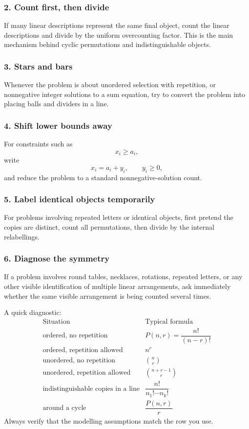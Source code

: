 \subsubsection*{2. Count first, then divide}
If many linear descriptions represent the same final object, count the linear descriptions and divide by the uniform overcounting factor. This is the main mechanism behind cyclic permutations and indistinguishable objects.

\subsubsection*{3. Stars and bars}
Whenever the problem is about unordered selection with repetition, or nonnegative integer solutions to a sum equation, try to convert the problem into placing balls and dividers in a line.

\subsubsection*{4. Shift lower bounds away}
For constraints such as
\[
x_i\ge a_i,
\]
write
\[
x_i=a_i+y_i,\qquad y_i\ge 0,
\]
and reduce the problem to a standard nonnegative-solution count.

\subsubsection*{5. Label identical objects temporarily}
For problems involving repeated letters or identical objects, first pretend the copies are distinct, count all permutations, then divide by the internal relabellings.

\subsubsection*{6. Diagnose the symmetry}
If a problem involves round tables, necklaces, rotations, repeated letters, or any other visible identification of multiple linear arrangements, ask immediately whether the same visible arrangement is being counted several times.

\begin{examtip}[title={High-yield distinction table}]
A quick diagnostic:
\[
\begin{array}{c|c}
\text{Situation} & \text{Typical formula} \\ \hline
\text{ordered, no repetition} & P(n,r)=\dfrac{n!}{(n-r)!} \\
\text{ordered, repetition allowed} & n^r \\
\text{unordered, no repetition} & \binom{n}{r} \\
\text{unordered, repetition allowed} & \binom{n+r-1}{r} \\
\text{indistinguishable copies in a line} & \dfrac{n!}{n_1!\cdots n_k!} \\
\text{around a cycle} & \dfrac{P(n,r)}{r}
\end{array}
\]
Always verify that the modelling assumptions match the row you use.
\end{examtip}


